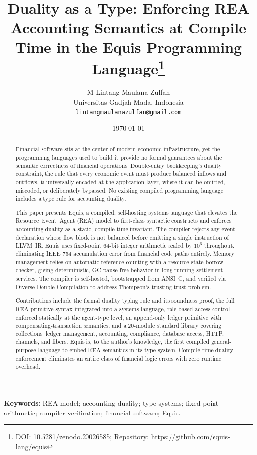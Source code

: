 \documentclass[11pt,a4paper]{article}
\title{Duality as a Type: Enforcing REA Accounting Semantics at Compile Time in the Equis Programming Language\thanks{DOI: \href{https://doi.org/10.5281/zenodo.20026585}{10.5281/zenodo.20026585}; Repository: \url{https://github.com/equis-lang/equis}}}
\author{M Lintang Maulana Zulfan\\
  Universitas Gadjah Mada, Indonesia\\
  \texttt{lintangmaulanazulfan@gmail.com}}
\date{\today}
\theoremstyle{remark}
\begin{document}

\maketitle

\begin{abstract}
Financial software sits at the center of modern economic infrastructure, yet
the programming languages used to build it provide no formal guarantees about
the semantic correctness of financial operations. Double-entry bookkeeping's
duality constraint, the rule that every economic event must produce balanced
inflows and outflows, is universally encoded at the application layer, where
it can be omitted, miscoded, or deliberately bypassed. No existing compiled
programming language includes a type rule for accounting duality.

This paper presents Equis, a compiled, self-hosting systems language that
elevates the Resource--Event--Agent (REA) model to first-class syntactic
constructs and enforces accounting duality as a static, compile-time
invariant. The compiler rejects any event declaration whose flow block is not
balanced before emitting a single instruction of LLVM~IR. Equis uses
fixed-point 64-bit integer arithmetic scaled by $10^{6}$ throughout,
eliminating IEEE 754 accumulation error from financial code paths entirely.
Memory management relies on automatic reference counting with a
resource-state borrow checker, giving deterministic, GC-pause-free behavior
in long-running settlement services. The compiler is self-hosted,
bootstrapped from ANSI~C, and verified via Diverse Double Compilation to
address Thompson's trusting-trust problem.

Contributions include the formal duality typing rule and its soundness
proof, the full REA primitive syntax integrated into a systems language,
role-based access control enforced statically at the agent-type level, an
append-only ledger primitive with compensating-transaction semantics, and a
20-module standard library covering collections, ledger management,
accounting, compliance, database access, HTTP, channels, and fibers. Equis
is, to the author's knowledge, the first compiled general-purpose language
to embed REA semantics in its type system. Compile-time duality enforcement
eliminates an entire class of financial logic errors with zero runtime
overhead.
\end{abstract}

\medskip
\noindent\textbf{Keywords:} REA model; accounting duality; type systems;
fixed-point arithmetic; compiler verification; financial software; Equis.
\end{document}
